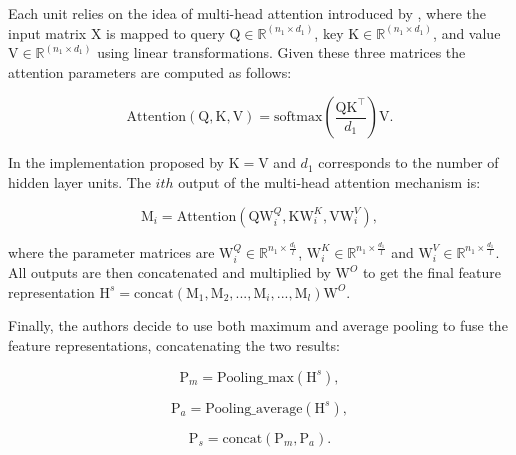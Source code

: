    Each unit relies on the idea of multi-head attention introduced by \cite{vaswani_attention}, where the input matrix $\mathrm{X}$ is mapped to query $\mathrm{Q} \in \mathbb{R}^{(n_1 \times d_1)}$, key $\mathrm{K} \in \mathbb{R}^{(n_1 \times d_1)}$, and value $\mathrm{V} \in \mathbb{R}^{(n_1 \times d_1)}$ using linear transformations. Given these three matrices the attention parameters are computed as follows:
    
    \begin{equation}
        \mathrm{Attention(Q,K,V)} = \mathrm{softmax}\left( \frac{\mathrm{QK}^\top}{d_1} \right)\mathrm{V}.
    \end{equation}
    
    In the implementation proposed by \cite{original_zhou} $\mathrm{K = V}$ and $d_1$ corresponds to the number of hidden layer units. The $ith$ output of the multi-head attention mechanism is: 
    
    \begin{equation}
        \mathrm{M}_i = \mathrm{Attention}(\mathrm{QW}^{Q}_{i},\mathrm{KW}^{K}_i,\mathrm{VW}^{V}_i),
    \end{equation}
    
    where the parameter matrices are $\mathrm{W}^{Q}_{i} \in \mathbb{R}^{n_1 \times \frac{d_1}{l}}$, $\mathrm{W}^{K}_{i} \in \mathbb{R}^{n_1 \times \frac{d_1}{l}}$ and $\mathrm{W}^{V}_{i} \in \mathbb{R}^{n_1 \times \frac{d_1}{l}}$. All outputs are then concatenated and multiplied by $\mathrm{W}^{O}$ to get the final feature representation $\mathrm{H}^s = \mathrm{concat}(\mathrm{M}_1, \mathrm{M}_2, ..., \mathrm{M}_i, ..., \mathrm{M}_l)\mathrm{W}^O$.
    
    Finally, the authors decide to use both maximum and average pooling \cite{shen_2018} to fuse the feature representations, concatenating the two results:
    
    \begin{equation}
        \mathrm{P}_m = \mathrm{Pooling\_max}(\mathrm{H}^s),
    \end{equation}
    
    \begin{equation}
        \mathrm{P}_a = \mathrm{Pooling\_average}(\mathrm{H}^s),
    \end{equation}
    
    \begin{equation}
        \mathrm{P}_s = \mathrm{concat}(\mathrm{P}_m, \mathrm{P}_a).
    \end{equation}


